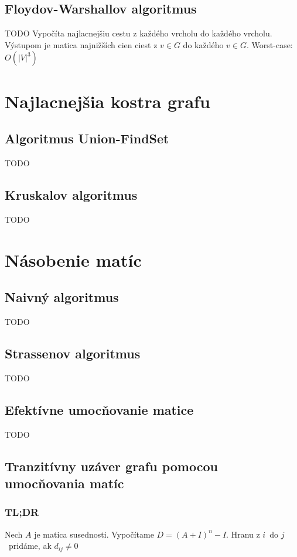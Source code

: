 	\subsection{Floydov-Warshallov algoritmus} TODO
		Vypočíta najlacnejšiu cestu z každého vrcholu do každého vrcholu. Výstupom je matica najnižších cien ciest z $v \in G$ do každého $v \in G$.
		Worst-case: $O(|V|^{3})$

\section{Najlacnejšia kostra grafu}

	\subsection{Algoritmus Union-FindSet} TODO

	\subsection{Kruskalov algoritmus} TODO

\section{Násobenie matíc}

	\subsection{Naivný algoritmus} TODO
	\subsection{Strassenov algoritmus} TODO
	\subsection{Efektívne umocňovanie matice} TODO
	\subsection{Tranzitívny uzáver grafu pomocou umocňovania matíc}

        \subsubsection{TL;DR}
        Nech $A$ je matica susednosti. Vypočítame $D = (A + I)^n - I$. Hranu z $i$ do $j$ pridáme,
        ak $d_{ij} \neq 0$

